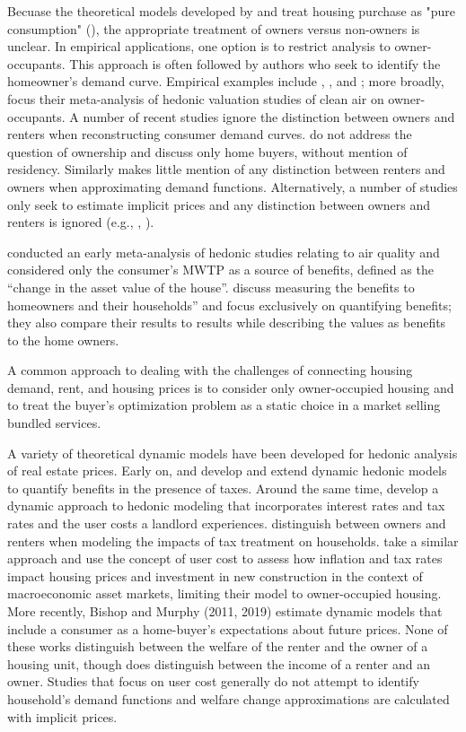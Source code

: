 \documentclass[ecta,nameyear,draft]{econsocart}
\theoremstyle{plain}
\theoremstyle{remark}
\begin{document}
Becuase the theoretical models developed by \cite{rosen74} and \cite{freeman74} treat housing purchase as "pure consumption" (\cite{rosen74}), the appropriate treatment of owners versus non-owners is unclear. In empirical applications, one option is to restrict analysis to owner-occupants. This approach is often followed by authors who seek to identify the homeowner's demand curve. Empirical examples include \cite{palmquist84}, \cite{zabelkiel00}, and \cite{chaygreenstone05}; more broadly, \cite{smithhuang95} focus their meta-analysis of hedonic valuation studies of clean air on owner-occupants. A number of recent studies ignore the distinction between owners and renters when reconstructing consumer demand curves. \cite{bishoptimmins18} do not address the question of ownership and discuss only home buyers, without mention of residency. Similarly \cite{banzhaf20} makes little mention of any distinction between renters and owners when approximating demand functions. Alternatively, a number of studies only seek to estimate implicit prices and any distinction between owners and renters is ignored (e.g., \cite{bajari12}, \cite{bui03} ).

\cite{smithhuang95} conducted an early meta-analysis of hedonic studies relating to air quality and considered only the consumer's MWTP as a source of benefits, defined as the “change in the asset value of the house”. \cite{zabelkiel00} discuss measuring the benefits to homeowners and their households” and focus exclusively on quantifying benefits; they also compare their results to \cite{smithhuang95} results while describing the values as benefits to the home owners. 

A common approach to dealing with the challenges of connecting housing demand, rent, and housing prices is to consider only owner-occupied housing and to treat the buyer's optimization problem as a static choice in a market selling bundled services. 


A variety of theoretical dynamic models have been developed for hedonic analysis of real estate prices. Early on, \cite{niskanen77} and \cite{freeman80} develop and extend dynamic hedonic models to quantify benefits in the presence of taxes. Around the same time, \cite{sonstelie80} develop a dynamic approach to hedonic modeling that incorporates interest rates and tax rates and the user costs a landlord experiences. \cite{hendershott83} distinguish between owners and renters when modeling the impacts of tax treatment on households. \cite{poterba84} take a similar approach and use the concept of user cost to assess how inflation and tax rates impact housing prices and investment in new construction in the context of macroeconomic asset markets, limiting their model to owner-occupied housing. More recently, Bishop and Murphy (2011, 2019) estimate dynamic models that include a consumer as a home-buyer's expectations about future prices. None of these works distinguish between the welfare of the renter and the owner of a housing unit, though \cite{hendershott83} does distinguish between the income of a renter and an owner. Studies that focus on user cost generally do not attempt to identify household's demand functions and welfare change approximations are calculated with implicit prices.
\end{document}
